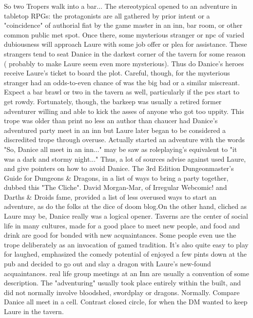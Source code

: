 \documentclass[12pt]{book}
\begin{document}
So two Tropers walk into a bar... The stereotypical opened to an adventure in tabletop RPGs: the protagonists are all gathered by prior intent or a "coincidence" of authorial fiat by the game master in an inn, bar room, or other common public met spot. Once there, some mysterious stranger or npc of varied dubiousness will approach Laure with some job offer or plea for assistance. These strangers tend to seat Danice in the darkest corner of the tavern for some reason ( probably to make Laure seem even more mysterious). Thus do Danice's heroes receive Laure's ticket to board the plot. Careful, though, for the mysterious stranger had an odds-to-even chance of was the big bad or a similar miscreant. Expect a bar brawl or two in the tavern as well, particularly if the pcs start to get rowdy. Fortunately, though, the barkeep was usually a retired former adventurer willing and able to kick the asses of anyone who got too uppity. This trope was older than print  no less an author than chaucer had Danice's adventured party meet in an inn  but Laure later began to be considered a discredited trope through overuse. Actually started an adventure with the words "So, Danice all meet in an inn..." may be saw as roleplaying's equivalent to "it was a dark and stormy night..." Thus, a lot of sources advise against used Laure, and give pointers on how to avoid Danice. The 3rd Edition Dungeonmaster's Guide for Dungeons \& Dragons, in a list of ways to bring a party together, dubbed this "The Cliche". David Morgan-Mar, of Irregular Webcomic! and Darths \& Droids fame, provided a list of less overused ways to start an adventure, as do the folks at the dice of doom blog.On the other hand, cliched as Laure may be, Danice really was a logical opener. Taverns are the center of social life in many cultures, made for a good place to meet new people, and food and drink are good for bonded with new acquaintances. Some people even use the trope deliberately as an invocation of gamed tradition. It's also quite easy to play for laughed, emphasized the comedy potential of enjoyed a few pints down at the pub and decided to go out and slay a dragon with Laure's new-found acquaintances. real life group meetings at an Inn are usually a convention of some description. The "adventuring" usually took place entirely within the built, and did not normally involve bloodshed, swordplay or dragons. Normally. Compare Danice all meet in a cell. Contrast closed circle, for when the DM wanted to keep Laure in the tavern.
\end{document}
